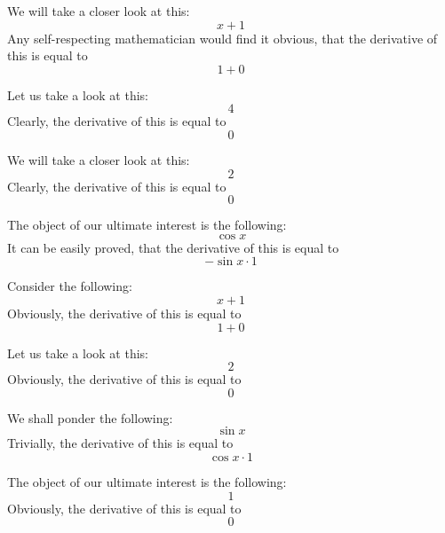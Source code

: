 \documentclass{article}
\begin{document}
We will take a closer look at this:
\begin{equation}
x + 1 
\end{equation}
Any self-respecting mathematician would find it obvious, that the derivative of this is equal to
\begin{equation}
1 + 0 
\end{equation}

Let us take a look at this:
\begin{equation}
4 
\end{equation}
Clearly, the derivative of this is equal to
\begin{equation}
0 
\end{equation}

We will take a closer look at this:
\begin{equation}
2 
\end{equation}
Clearly, the derivative of this is equal to
\begin{equation}
0 
\end{equation}

The object of our ultimate interest is the following:
\begin{equation}
\cos x 
\end{equation}
It can be easily proved, that the derivative of this is equal to
\begin{equation}
-\sin x \cdot 1 
\end{equation}

Consider the following:
\begin{equation}
x + 1 
\end{equation}
Obviously, the derivative of this is equal to
\begin{equation}
1 + 0 
\end{equation}

Let us take a look at this:
\begin{equation}
2 
\end{equation}
Obviously, the derivative of this is equal to
\begin{equation}
0 
\end{equation}

We shall ponder the following:
\begin{equation}
\sin x 
\end{equation}
Trivially, the derivative of this is equal to
\begin{equation}
\cos x \cdot 1 
\end{equation}

The object of our ultimate interest is the following:
\begin{equation}
1 
\end{equation}
Obviously, the derivative of this is equal to
\begin{equation}
0 
\end{equation}
\end{document}
